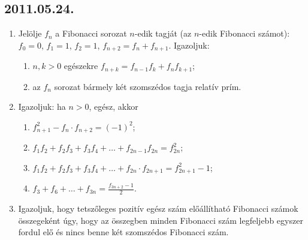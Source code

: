 \documentclass{article}
\begin{document}
\subsection*{2011.05.24.}
\begin{enumerate}
\item Jelölje $f_n$ a Fibonacci sorozat $n$-edik tagját (az $n$-edik Fibonacci számot): $f_0=0$, $f_1=1$, $f_2=1$, $f_{n+2}=f_n+f_{n+1}$. Igazoljuk:
\begin{enumerate}
\item $n, k > 0$ egészekre $f_{n+k}=f_{n-1}f_k+f_nf_{k+1}$;
\item az $f_n$ sorozat bármely két szomszédos tagja relatív prím.
\end{enumerate}
\item Igazoljuk: ha $n > 0$, egész, akkor
\begin{enumerate}
\item $f_{n+1}^2-f_n\cdot f_{n+2}=(-1)^2$;
\item $f_1f_2+f_2f_3+f_3f_4+\ldots+f_{2n-1}f_{2n}=f_{2n}^2$;
\item $f_1f_2+f_2f_3+f_3f_4+\ldots+f_{2n}\cdot f_{2n+1}=f_{2n+1}^2-1$;
\item $f_3+f_6+\ldots+f_{3n}=\frac{f_{3n+2}-1}{2}$.
\end{enumerate}
\item Igazoljuk, hogy tetszőleges pozitív egész szám előállítható Fibonacci számok összegeként úgy, hogy az összegben minden Fibonacci szám legfeljebb egyszer fordul elő és nincs benne két szomszédos Fibonacci szám.
\end{enumerate}
\end{document}
